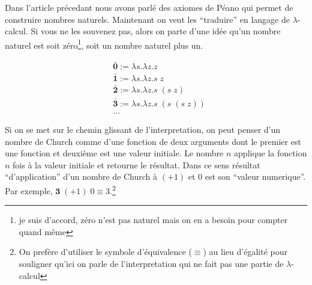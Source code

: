 Dans l'article précedant nous avons parlé des axiomes de Péano qui permet de construire nombres naturels.
Maintenant on veut les ``traduire'' en langage de $\lambda$-calcul.
Si vous ne les souvenez pas, alors on parte d'une idée qu'un nombre naturel est soit zéro\footnote{je suis d'accord, zéro n'est pas naturel mais on en a besoin pour compter quand même}, soit un nombre naturel plus un.
\begin{definition}
	\begin{align*}
		& \mathbf{\bar{0}} := \lambda s. \lambda z. z \\
		& \mathbf{\bar{1}} := \lambda s. \lambda z. s \; z \\
		& \mathbf{\bar{2}} := \lambda s. \lambda z. s \; (s \; z) \\
		& \mathbf{\bar{3}} := \lambda s. \lambda z. s \; (s \; (s \; z)) \\
		& \ldots
	\end{align*}
\end{definition}
Si on se met sur le chemin glissant de l'interpretation, on peut penser d'un nombre de Church comme d'une fonction de deux arguments dont le premier est une fonction et deuxième est une valeur initiale.
Le nombre $n$ applique la fonction $n$ fois à la valeur initiale et retourne le résultat.
Dans ce sens résultat ``d'application'' d'un nombre de Church à $(+1)$ et 0 est son ``valeur numerique''.
Par exemple, $\mathbf{3} \; (+1) \; 0 \equiv 3$.\footnote{On prefère d'utiliser le symbole d'équivalence ($\equiv$) au lieu d'égalité pour souligner qu'ici on parle de l'interpretation qui ne fait pas une partie de $\lambda$-calcul}

